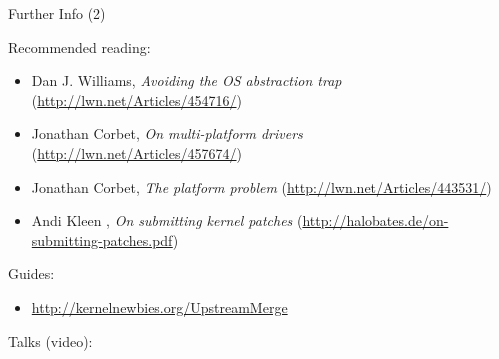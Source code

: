 \documentclass{beamer}
\begin{document}
\begin{frame}{Further Info (2)}

  Recommended reading:
  \begin{itemize}
  \item Dan J. Williams, \emph{Avoiding the OS abstraction trap}
    (\url{http://lwn.net/Articles/454716/})
  \item Jonathan Corbet, \emph{On multi-platform drivers}
    (\url{http://lwn.net/Articles/457674/})
  \item Jonathan Corbet, \emph{The platform problem}
    (\url{http://lwn.net/Articles/443531/})
  \item Andi Kleen , \emph{On submitting kernel patches}
    (\url {http://halobates.de/on-submitting-patches.pdf})
  \end{itemize}

  Guides:
  \begin{itemize}
  \item \url {http://kernelnewbies.org/UpstreamMerge}
  \end{itemize}

  Talks (video):

\end{frame}
\end{document}
